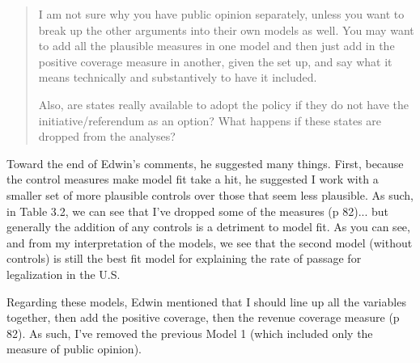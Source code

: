 \documentclass[12pt,stdletter,dateno,sigleft]{newlfm} %
\begin{document}
\begin{newlfm}
\begin{quotation}
{\noindent I am not sure why you have public opinion separately, unless you want to break up the other arguments into their own models as well.  You may want to add all the plausible measures in one model and then just add in the positive coverage measure in another, given the set up, and say what it means technically and substantively to have it included.\newline

\noindent Also, are states really available to adopt the policy if they do not have the initiative/referendum as an option? What happens if these states are dropped from the analyses? 
}
\end{quotation}



Toward the end of Edwin's comments, he suggested many things. First, because the control measures make model fit take a hit, he suggested I work with a smaller set of more plausible controls over those that seem less plausible. As such, in Table 3.2, we can see that I've dropped some of the measures (p 82)... but generally the addition of any controls is a detriment to model fit. As you can see, and from my interpretation of the models, we see that the second model (without controls) is still the best fit model for explaining the rate of passage for legalization in the U.S.

Regarding these models, Edwin mentioned that I should line up all the variables together, then add the positive coverage, then the revenue coverage measure (p 82). As such, I've removed the previous Model 1 (which included only the measure of public opinion).


\end{newlfm}
\end{document}
